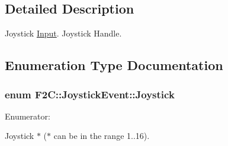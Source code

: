 \subsection{Detailed Description}
Joystick \hyperlink{class_f2_c_1_1_input}{Input}. Joystick Handle. 

\subsection{Enumeration Type Documentation}
\hypertarget{namespace_f2_c_1_1_joystick_event_ada0230f460f765718db17ac021cbfc1f}{
\subsubsection[{Joystick}]{\setlength{\rightskip}{0pt plus 5cm}enum {\bf F2C::JoystickEvent::Joystick}}}
\label{namespace_f2_c_1_1_joystick_event_ada0230f460f765718db17ac021cbfc1f}
\begin{Desc}
\item[Enumerator: ]\par
\begin{description}
\item[{\em 
\hypertarget{namespace_f2_c_1_1_joystick_event_ada0230f460f765718db17ac021cbfc1fa4034419a862baa7e71c2daafe7811546}{
Joystick1}
\label{namespace_f2_c_1_1_joystick_event_ada0230f460f765718db17ac021cbfc1fa4034419a862baa7e71c2daafe7811546}
}]Joystick $\ast$ ($\ast$ can be in the range 1..16). \end{description}
\end{Desc}

